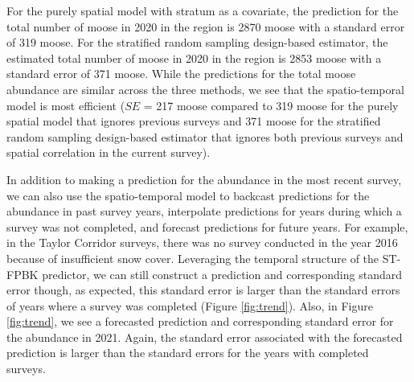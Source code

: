 \documentclass[smallextended]{svjour3}       %
\begin{document}
For the purely spatial model with stratum as a covariate, the prediction
for the total number of moose in 2020 in the region is 2870 moose with a
standard error of 319 moose. For the stratified random sampling
design-based estimator, the estimated total number of moose in 2020 in
the region is 2853 moose with a standard error of 371 moose. While the
predictions for the total moose abundance are similar across the three
methods, we see that the spatio-temporal model is most efficient (\(SE\)
= 217 moose compared to 319 moose for the purely spatial model that
ignores previous surveys and 371 moose for the stratified random
sampling design-based estimator that ignores both previous surveys and
spatial correlation in the current survey).

In addition to making a prediction for the abundance in the most recent
survey, we can also use the spatio-temporal model to backcast
predictions for the abundance in past survey years, interpolate
predictions for years during which a survey was not completed, and
forecast predictions for future years. For example, in the Taylor
Corridor surveys, there was no survey conducted in the year 2016 because
of insufficient snow cover. Leveraging the temporal structure of the
ST-FPBK predictor, we can still construct a prediction and corresponding
standard error though, as expected, this standard error is larger than
the standard errors of years where a survey was completed (Figure
\ref{fig:trend}). Also, in Figure \ref{fig:trend}, we see a forecasted
prediction and corresponding standard error for the abundance in 2021.
Again, the standard error associated with the forecasted prediction is
larger than the standard errors for the years with completed surveys.
\end{document}
